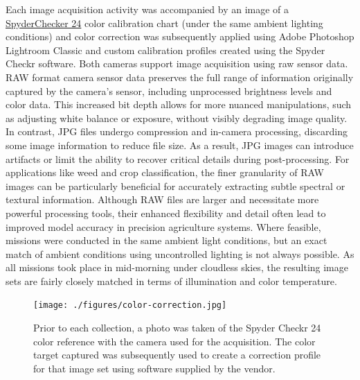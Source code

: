 \documentclass[letterpaper, notitlepage]{report}
\begin{document}
Each image acquisition activity was accompanied by an image of a \href{https://www.datacolor.com/spyder/products/spyder-checkr-photo/} {SpyderChecker 24} color calibration chart (under the same ambient lighting conditions) and color correction was subsequently applied using Adobe Photoshop Lightroom Classic and custom calibration profiles created using the Spyder Checkr software.  Both cameras support image acquisition using raw sensor data. RAW format camera sensor data preserves the full range of information originally captured by the camera’s sensor, including unprocessed brightness levels and color data. This increased bit depth allows for more nuanced manipulations, such as adjusting white balance or exposure, without visibly degrading image quality. In contrast, JPG files undergo compression and in-camera processing, discarding some image information to reduce file size. As a result, JPG images can introduce artifacts or limit the ability to recover critical details during post-processing. For applications like weed and crop classification, the finer granularity of RAW images can be particularly beneficial for accurately extracting subtle spectral or textural information. Although RAW files are larger and necessitate more powerful processing tools, their enhanced flexibility and detail often lead to improved model accuracy in precision agriculture systems. Where feasible, missions were conducted in the same ambient light conditions, but an exact match of ambient conditions using uncontrolled lighting is not always possible. As all missions took place in mid-morning under cloudless skies, the resulting image sets are fairly closely matched in terms of illumination and color temperature.


\begin{figure}[!htb]
	\centering
	\texttt{[image: ./figures/color-correction.jpg]}
	\caption[Color correction target and image set identification]{Prior to each collection, a photo was taken of the Spyder Checkr 24 color reference with the camera used for the acquisition. The color target captured was subsequently used to create a correction profile for that image set using software supplied by the vendor.}
	\label{fig:color-correction}
\end{figure}
\end{document}
